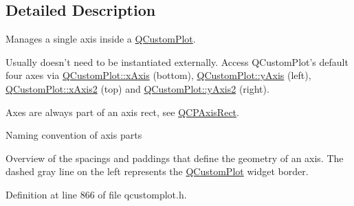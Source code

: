 \subsection{Detailed Description}
Manages a single axis inside a \hyperlink{class_q_custom_plot}{Q\-Custom\-Plot}. 

Usually doesn't need to be instantiated externally. Access Q\-Custom\-Plot's default four axes via \hyperlink{class_q_custom_plot_a968b5ac86c181a49bba78c2b62a80cb3}{Q\-Custom\-Plot\-::x\-Axis} (bottom), \hyperlink{class_q_custom_plot_af6fea5679725b152c14facd920b19367}{Q\-Custom\-Plot\-::y\-Axis} (left), \hyperlink{class_q_custom_plot_ada41599f22cad901c030f3dcbdd82fd9}{Q\-Custom\-Plot\-::x\-Axis2} (top) and \hyperlink{class_q_custom_plot_af13fdc5bce7d0fabd640f13ba805c0b7}{Q\-Custom\-Plot\-::y\-Axis2} (right).

Axes are always part of an axis rect, see \hyperlink{class_q_c_p_axis_rect}{Q\-C\-P\-Axis\-Rect}.  \begin{center}Naming convention of axis parts\end{center}  \par


 \begin{center}Overview of the spacings and paddings that define the geometry of an axis. The dashed gray line on the left represents the \hyperlink{class_q_custom_plot}{Q\-Custom\-Plot} widget border.\end{center}  

Definition at line 866 of file qcustomplot.\-h.



